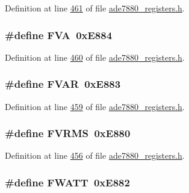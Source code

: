 Definition at line \hyperlink{a00036_source_l00461}{461} of file \hyperlink{a00036_source}{ade7880\-\_\-registers.\-h}.

\hypertarget{a00036_a2c02e499fcc895be334b284c7d928a0c}{
\subsubsection[{F\-V\-A}]{\setlength{\rightskip}{0pt plus 5cm}\#define F\-V\-A~0x\-E884}}\label{de/d8c/a00036_a2c02e499fcc895be334b284c7d928a0c}


Definition at line \hyperlink{a00036_source_l00460}{460} of file \hyperlink{a00036_source}{ade7880\-\_\-registers.\-h}.

\hypertarget{a00036_a57335a9934a3428994476326141589ed}{
\subsubsection[{F\-V\-A\-R}]{\setlength{\rightskip}{0pt plus 5cm}\#define F\-V\-A\-R~0x\-E883}}\label{de/d8c/a00036_a57335a9934a3428994476326141589ed}


Definition at line \hyperlink{a00036_source_l00459}{459} of file \hyperlink{a00036_source}{ade7880\-\_\-registers.\-h}.

\hypertarget{a00036_ae580fd9f9739589e08315bff869b16cf}{
\subsubsection[{F\-V\-R\-M\-S}]{\setlength{\rightskip}{0pt plus 5cm}\#define F\-V\-R\-M\-S~0x\-E880}}\label{de/d8c/a00036_ae580fd9f9739589e08315bff869b16cf}


Definition at line \hyperlink{a00036_source_l00456}{456} of file \hyperlink{a00036_source}{ade7880\-\_\-registers.\-h}.

\hypertarget{a00036_a002eccf714bbac8b4e8953f4be2efef4}{
\subsubsection[{F\-W\-A\-T\-T}]{\setlength{\rightskip}{0pt plus 5cm}\#define F\-W\-A\-T\-T~0x\-E882}}\label{de/d8c/a00036_a002eccf714bbac8b4e8953f4be2efef4}



